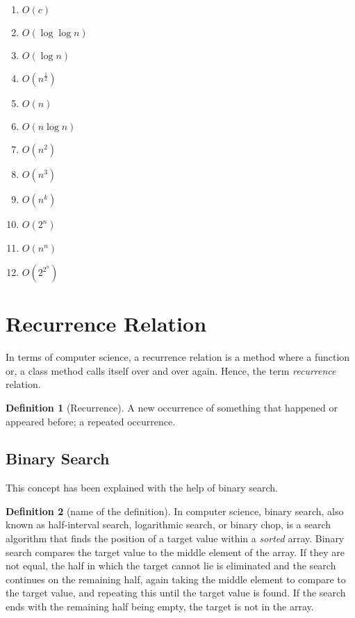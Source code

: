 \documentclass[a4paper,12pt]{article}
\theoremstyle{definition}
\newtheorem{definition}{Definition}
\begin{document}
    \begin{enumerate}
        \item $O(c)$
        \item $O(\log \log n)$
        \item $O(\log n)$
        \item $O(n^\frac{1}{2})$
        \item $O(n)$
        \item $O(n\log n)$
        \item $O(n^2)$
        \item $O(n^3)$
        \item $O(n^k)$
        \item $O(2^n)$
        \item $O(n^n)$
        \item $O(2^{2^n})$
    \end{enumerate}


    \section{Recurrence Relation}\label{lb:recurrence_main}

    In terms of computer science, a recurrence relation is a method where a function or, a class method calls itself
    over and over again.
    Hence, the term \textit{recurrence} relation.

    \begin{definition}[Recurrence]
        A new occurrence of something that happened or appeared before; a repeated occurrence.
    \end{definition}

    \subsection{Binary Search}

    This concept has been explained with the help of binary search.

    \begin{definition}[name of the definition]
        In computer science, binary search, also known as half-interval search, logarithmic search, or binary chop,
        is a search algorithm that finds the position of a target value within a \textit{sorted} array.
        Binary search compares the target value to the middle element of the array.
        If they are not equal, the half in which the target cannot lie is eliminated and the search continues on the
        remaining half, again taking the middle element to compare to the target value, and repeating this until
        the target value is found.
        If the search ends with the remaining half being empty, the target is not in the array.
    \end{definition}
\end{document}

